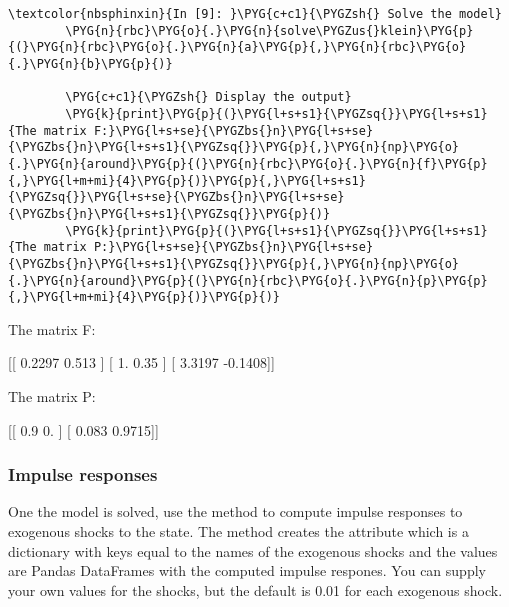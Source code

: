 \documentclass[letterpaper,10pt,openany,oneside,english]{sphinxmanual}
\begin{document}
\begin{Verbatim}[commandchars=\\\{\}]
\textcolor{nbsphinxin}{In [9]: }\PYG{c+c1}{\PYGZsh{} Solve the model}
        \PYG{n}{rbc}\PYG{o}{.}\PYG{n}{solve\PYGZus{}klein}\PYG{p}{(}\PYG{n}{rbc}\PYG{o}{.}\PYG{n}{a}\PYG{p}{,}\PYG{n}{rbc}\PYG{o}{.}\PYG{n}{b}\PYG{p}{)}
        
        \PYG{c+c1}{\PYGZsh{} Display the output}
        \PYG{k}{print}\PYG{p}{(}\PYG{l+s+s1}{\PYGZsq{}}\PYG{l+s+s1}{The matrix F:}\PYG{l+s+se}{\PYGZbs{}n}\PYG{l+s+se}{\PYGZbs{}n}\PYG{l+s+s1}{\PYGZsq{}}\PYG{p}{,}\PYG{n}{np}\PYG{o}{.}\PYG{n}{around}\PYG{p}{(}\PYG{n}{rbc}\PYG{o}{.}\PYG{n}{f}\PYG{p}{,}\PYG{l+m+mi}{4}\PYG{p}{)}\PYG{p}{,}\PYG{l+s+s1}{\PYGZsq{}}\PYG{l+s+se}{\PYGZbs{}n}\PYG{l+s+se}{\PYGZbs{}n}\PYG{l+s+s1}{\PYGZsq{}}\PYG{p}{)}
        \PYG{k}{print}\PYG{p}{(}\PYG{l+s+s1}{\PYGZsq{}}\PYG{l+s+s1}{The matrix P:}\PYG{l+s+se}{\PYGZbs{}n}\PYG{l+s+se}{\PYGZbs{}n}\PYG{l+s+s1}{\PYGZsq{}}\PYG{p}{,}\PYG{n}{np}\PYG{o}{.}\PYG{n}{around}\PYG{p}{(}\PYG{n}{rbc}\PYG{o}{.}\PYG{n}{p}\PYG{p}{,}\PYG{l+m+mi}{4}\PYG{p}{)}\PYG{p}{)}
\end{Verbatim}
\begin{OriginalVerbatim}[commandchars=\\\{\}]
The matrix F:

 [[ 0.2297  0.513 ]
 [ 1.      0.35  ]
 [ 3.3197 -0.1408]]


The matrix P:

 [[ 0.9     0.    ]
 [ 0.083   0.9715]]
\end{OriginalVerbatim}

\subsubsection{Impulse responses}
\label{\detokenize{examples:Impulse-responses}}
One the model is solved, use the  method to compute impulse
responses to exogenous shocks to the state. The method creates the
 attribute which is a dictionary with keys equal to the names of
the exogenous shocks and the values are Pandas DataFrames with the
computed impulse respones. You can supply your own values for the
shocks, but the default is 0.01 for each exogenous shock.
\end{document}
